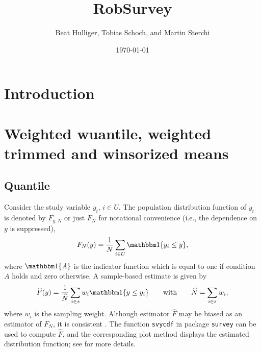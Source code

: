 \documentclass[a4paper,11pt]{scrreprt}
\begin{document}

\title{\Large RobSurvey}
\author{Beat Hulliger, Tobias Schoch, and Martin Sterchi}
\date{{\small \today}}
\maketitle
\tableofcontents

\chapter{Introduction}\label{ch:introduction}


\chapter{Weighted wuantile, weighted trimmed and winsorized means}\label{ch:basic}


\section{Quantile}
Consider the study variable $y_i$, $i \in U$. The population distribution function of $y_i$ is denoted by $F_{y,N}$ or just $F_N$ for notational convenience (i.e., the dependence on $y$ is suppressed), 
\begin{equation*}
   F_N(y) = \frac{1}{N}\sum_{i \in U} \indicator\{y_i \leq y \}, 
\end{equation*}
\noindent where $\indicator\{ A \}$ is the indicator function which is equal to one if condition $A$ holds and zero otherwise. A sample-based estimate is given by 
\begin{equation*}
   \widehat{F}(y) = \frac{1}{\widehat{N}}\sum_{i \in s} w_i \indicator\{y \leq y_i \} \qquad \text{with} \qquad \widehat{N} = \sum_{i \in s} w_i,  
\end{equation*}
\noindent where $w_i$ is the sampling weight. Although estimator $\widehat{F}$ may be biased as an estimator of $F_N$, it is consistent \citep[][]{sarndaletal1992}. The function \texttt{svycdf} in package \texttt{survey} can be used to compute $\widehat{F}$, and the corresponding plot method displays the estimated distribution function; see \citet[][ch. 4.3.1]{lumley2010} for more details. 
  
\end{document}

